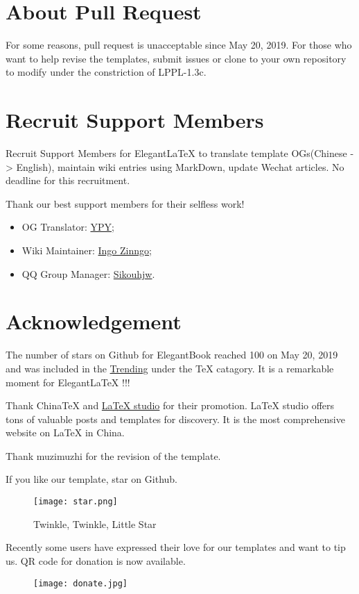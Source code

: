 \documentclass[fancy,blue,11pt]{elegantbook}
\begin{document}
\section{About Pull Request}
For some reasons, pull request is unacceptable since May 20, 2019. For those who want to help revise the templates, submit issues or clone to your own repository to modify under the constriction of  LPPL-1.3c.

\section{Recruit Support Members}
Recruit Support Members for Elegant\LaTeX{} to translate template OGs(Chinese -> English), maintain wiki entries using MarkDown, update Wechat articles. No deadline for this recruitment.

Thank our best support members for their selfless work!
\begin{itemize}
	\item OG Translator: \href{https://github.com/peggy2006xzyz}{YPY};
	\item Wiki Maintainer: \href{https://github.com/izinngo}{Ingo Zinngo};
	\item QQ Group Manager: \href{https://github.com/sikouhjw}{Sikouhjw}.
\end{itemize}

\section{Acknowledgement}
The number of stars on Github for ElegantBook reached 100 on May 20, 2019 and was included in the \href{https://github.com/trending/tex?since=daily}{Trending} under the \TeX{} catagory. It is a remarkable moment for Elegant\LaTeX{} !!!

Thank China\TeX{} and \href{http://www.latexstudio.net/}{\LaTeX{} studio} for their promotion. \LaTeX{} studio offers tons of valuable posts and templates for discovery. It is the most comprehensive website on \LaTeX{} in China.

Thank muzimuzhi for the revision of the template.

If you like our template, star on Github.
\begin{figure}[htbp]
	\centering
	\texttt{[image: star.png]}
	\caption{Twinkle, Twinkle, Little Star}
\end{figure}
Recently some users have expressed their love for our templates and want to tip us. QR code for donation is now available.
\begin{figure}[htbp]
	\centering
	\texttt{[image: donate.jpg]}
\end{figure}
\end{document}
